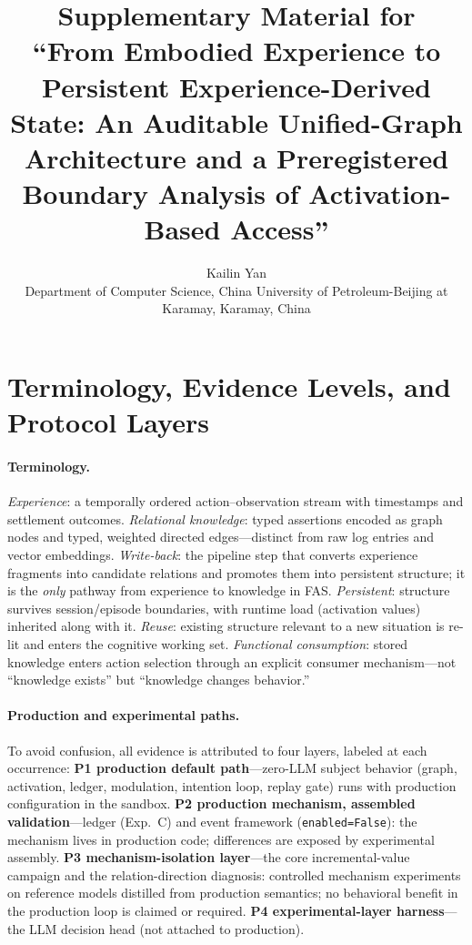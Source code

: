 \documentclass[10pt]{article}
\title{\bfseries Supplementary Material for\\
``From Embodied Experience to Persistent Experience-Derived State: An Auditable Unified-Graph Architecture and a Preregistered Boundary Analysis of Activation-Based Access''}
\author{Kailin Yan\\ \small Department of Computer Science, China University of Petroleum-Beijing at Karamay, Karamay, China}
\date{}
\begin{document}
\long\gdef\theabstract{}
\maketitle

\section{Terminology, Evidence Levels, and Protocol Layers}
\label{s1:term}

\paragraph{Terminology.} \emph{Experience}: a temporally ordered action--observation stream with timestamps and settlement outcomes. \emph{Relational knowledge}: typed assertions encoded as graph nodes and typed, weighted directed edges---distinct from raw log entries and vector embeddings. \emph{Write-back}: the pipeline step that converts experience fragments into candidate relations and promotes them into persistent structure; it is the \emph{only} pathway from experience to knowledge in FAS. \emph{Persistent}: structure survives session/episode boundaries, with runtime load (activation values) inherited along with it. \emph{Reuse}: existing structure relevant to a new situation is re-lit and enters the cognitive working set. \emph{Functional consumption}: stored knowledge enters action selection through an explicit consumer mechanism---not ``knowledge exists'' but ``knowledge changes behavior.''

\paragraph{Production and experimental paths.} To avoid confusion, all evidence is attributed to four layers, labeled at each occurrence: \textbf{P1 production default path}---zero-LLM subject behavior (graph, activation, ledger, modulation, intention loop, replay gate) runs with production configuration in the sandbox. \textbf{P2 production mechanism, assembled validation}---ledger (Exp.~C) and event framework (\texttt{enabled=False}): the mechanism lives in production code; differences are exposed by experimental assembly. \textbf{P3 mechanism-isolation layer}---the core incremental-value campaign and the relation-direction diagnosis: controlled mechanism experiments on reference models distilled from production semantics; no behavioral benefit in the production loop is claimed or required. \textbf{P4 experimental-layer harness}---the LLM decision head (not attached to production).
\end{document}

